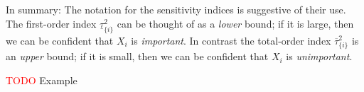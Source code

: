 \documentclass[../primer.tex]{subfiles}
\begin{document}
In summary: The notation for the sensitivity indices is suggestive of their use.
The first-order index $\underline{\tau}_{\{i\}}^2$ can be thought of as a
\emph{lower} bound; if it is large, then we can be confident that $X_i$ is
\emph{important}. In contrast the total-order index $\overline{\tau}_{\{i\}}^2$
is an \emph{upper} bound; if it is small, then we can be confident that $X_i$ is
\emph{unimportant}.

\textcolor{red}{TODO} Example
\end{document}
